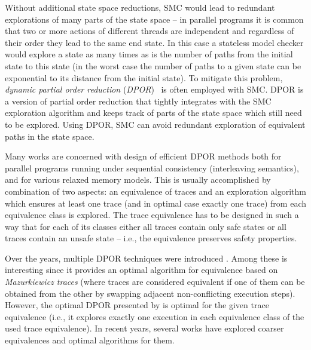 Without additional state space reductions, SMC would lead to redundant
explorations of many parts of the state space -- in parallel programs it is
common that two or more actions of different threads are independent and
regardless of their order they lead to the same end state.
In this case a stateless model checker would explore a state as many times as
is the number of paths from the initial state to this state (in the worst case
the number of paths to a given state can be exponential to its distance from
the initial state).
To mitigate this problem, \emph{dynamic partial order reduction}
(\emph{DPOR})~ is often employed with SMC.
DPOR is a version of partial order reduction that tightly integrates with
the SMC exploration algorithm and keeps track of parts of the state space which
still need to be explored.
Using DPOR, SMC can avoid redundant exploration of equivalent paths in the
state space.

Many works are concerned with design of efficient DPOR methods both for
parallel programs running under sequential consistency (interleaving
semantics), and for various relaxed memory models.
This is usually accomplished by combination of two aspects: an equivalence of
traces and an exploration algorithm which ensures at least one trace (and in
optimal case exactly one trace) from each equivalence class is explored.
The trace equivalence has to be designed in such a way that for each of its
classes either all traces contain only safe states or all traces contain an
unsafe state -- i.e., the equivalence preserves safety properties.

Over the years, multiple DPOR techniques were introduced
.
Among these  is interesting since it provides an optimal algorithm for equivalence based on \emph{Mazurkiewicz traces}  (where traces are considered equivalent if one of them can be obtained from the other by swapping adjacent non-conflicting execution steps).
However, the optimal DPOR presented by  is optimal for the
given trace equivalence (i.e., it explores exactly one execution in each equivalence class of the used trace equivalence).
In recent years, several works have explored coarser equivalences and optimal algorithms for them.


